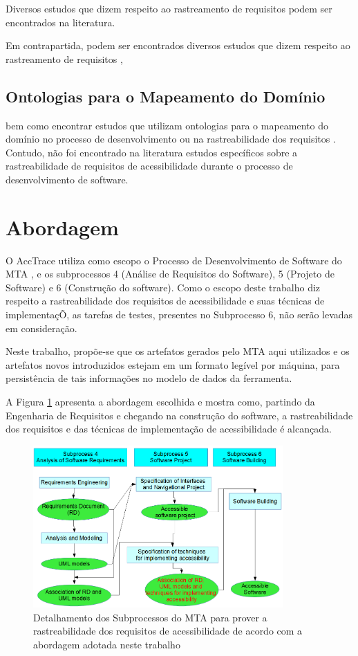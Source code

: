 \documentclass[runningheads,a4paper]{llncs}
\begin{document}
Diversos estudos que dizem respeito ao rastreamento de requisitos podem ser
encontrados na literatura.

 Em contrapartida, podem ser encontrados diversos
estudos que dizem respeito ao rastreamento de requisitos
\cite{5970169,292398,5485417,6405269}, 

\subsection{Ontologias para o Mapeamento do Domínio}

bem como encontrar estudos que utilizam
ontologias para o mapeamento do domínio no processo de desenvolvimento ou na
rastreabilidade dos requisitos \cite{5223183,6511842,4148940,5362244}. Contudo,
não foi encontrado na literatura estudos específicos sobre a rastreabilidade de
requisitos de acessibilidade durante o processo de desenvolvimento de software.

\section{Abordagem}

O AccTrace utiliza como escopo o Processo de Desenvolvimento de Software do MTA
\cite{maia:10}, e os subprocessos 4 (Análise de Requisitos do Software), 5
(Projeto de Software) e 6 (Construção do software). Como o escopo deste trabalho
diz respeito a rastreabilidade dos requisitos de acessibilidade e suas técnicas
de implementaçÕ, as tarefas de testes, presentes no Subprocesso 6, não serão
levadas em consideração. 

Neste trabalho, propõe-se que os artefatos gerados pelo MTA aqui utilizados e os
artefatos novos introduzidos estejam em um formato legível por máquina, para
persistência de tais informações no modelo de dados da ferramenta.

A Figura \ref{fig:figmagica} apresenta a abordagem escolhida e mostra como,
partindo da Engenharia de Requisitos e chegando na construção do software,
a rastreabilidade dos requisitos e das técnicas de implementação de
acessibilidade é alcançada.

\begin{figure}[h]
\centering
\includegraphics[height=6.2cm]{img/figuramagica.png}
\caption{Detalhamento dos Subprocessos do MTA para prover a rastreabilidade dos
requisitos de acessibilidade de acordo com a abordagem adotada neste trabalho}
\label{fig:figmagica}
\end{figure}
\end{document}
